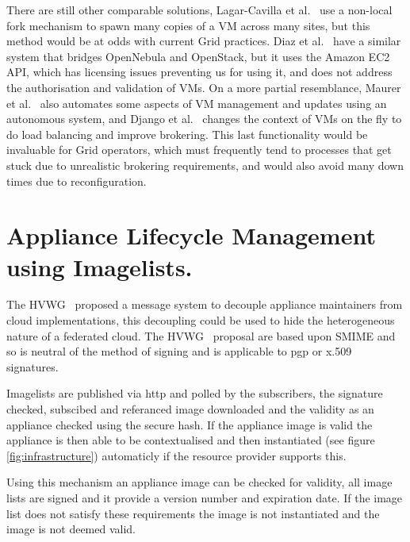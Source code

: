 \documentclass{llncs_Ibergrid2013}
\begin{document}
There are still other comparable solutions, Lagar-Cavilla et al.~\cite{Lagar-Cavilla2009} use a non-local fork mechanism to spawn many copies of a VM across many sites, but this method would be at odds with current Grid practices. Diaz et al.~\cite{Diaz2012} have a similar system that bridges OpenNebula and OpenStack, but it uses the Amazon EC2 API, which has licensing issues preventing us for using it, and does not address the authorisation and validation of VMs. On a more partial resemblance, Maurer et al.~\cite{Maurer2013} also automates some aspects of VM management and updates using an autonomous system, and Django et al.~\cite{Django2013} changes the context of VMs on the fly to do load balancing and improve brokering. This last functionality would be invaluable for Grid operators, which must frequently tend to processes that get stuck due to unrealistic brokering requirements, and would also avoid many down times due to reconfiguration.

\section{Appliance Lifecycle Management using Imagelists.}
\label{sect-appliancelifecycle}
The HVWG~\cite{hepix} proposed a message system to decouple appliance maintainers from cloud implementations, this decoupling could be used to hide the heterogeneous nature of a federated cloud. The HVWG~\cite{hepix} proposal are based upon SMIME and so is neutral of the method of signing and is applicable to pgp or x.509 signatures.

Imagelists are published via http and polled by the subscribers, the signature checked, subscibed and referanced image downloaded and the validity as an appliance checked using the secure hash. If the appliance image is valid the appliance is then able to be contextualised and then instantiated (see figure \ref{fig:infrastructure}) automaticly if the resource provider supports this.

Using this mechanism an appliance image can be checked for validity, all image lists are signed and it provide a version number and expiration date. If the image list does not satisfy these requirements the image is not instantiated and the image is not deemed valid.
\end{document}
